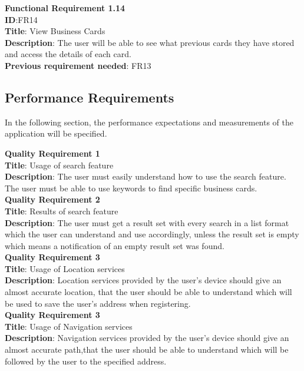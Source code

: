 \documentclass[english]{article}
\begin{document}
				\textbf{Functional Requirement 1.14}\\
				\textbf{ID}:FR14\\
				\textbf{Title}: View Business Cards\\
				\textbf{Description}: The user will be able to see what previous cards they have stored and access the details of each card.\\
				\textbf{Previous requirement needed}: FR13\\
				\subsection{Performance Requirements}
				In the following section, the performance expectations and measurements of the application will be specified.
				
				\textbf{Quality Requirement 1}\\
				\textbf{Title}: Usage of search feature\\
				\textbf{Description}: The user must easily understand how to use the search feature. The user must be able to use keywords to find specific business cards.\\
				
				\textbf{Quality Requirement 2}\\
				\textbf{Title}: Results of search feature\\
				\textbf{Description}: The user must get a result set with every search in a list format which the user can understand and use accordingly, unless the result set is empty which means a notification of an empty result set was found.\\
				
				\textbf{Quality Requirement 3}\\
				\textbf{Title}: Usage of Location services\\
				\textbf{Description}: Location services provided by the user's device should give an almost accurate location, that the user should be able to understand which will be used to save the user's address when registering.\\
				
				\textbf{Quality Requirement 3}\\
				\textbf{Title}: Usage of Navigation services\\
				\textbf{Description}: Navigation services provided by the user's device should give an almost accurate path,that the user should be able to understand which will be followed by the user to the specified address.\\
				
\end{document}
